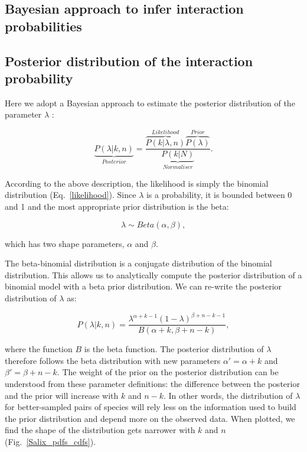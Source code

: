 \documentclass[12pt]{article}
\begin{document}
\begin{spacing}{2.0}
\section*{Bayesian approach to infer interaction probabilities}

    \subsection*{Posterior distribution of the interaction probability}

      Here we adopt a Bayesian approach to estimate the posterior distribution of the parameter $\lambda$ :

      \begin{equation}
        \underbrace{P(\lambda|k,n)}_{Posterior} = \frac{\overbrace{P(k|\lambda,n)}^{Likelihood}\overbrace{P(\lambda)}^{Prior}}{\underbrace{P(k|N)}_{Normaliser}} .
        \label{posterior}
      \end{equation}

      According to the above description, the likelihood is simply the binomial distribution (Eq.~\ref{likelihood}). Since $\lambda$ is a probability, it is bounded between 0 and 1 and the most appropriate prior distribution is the beta:

      \begin{equation}
        \lambda \sim Beta(\alpha,\beta) , \label{prior}
      \end{equation}

      \noindent which has two shape parameters, $\alpha$ and $\beta$. 

     The beta-binomial distribution is a conjugate distribution of the binomial distribution. This allows us to analytically compute the posterior distribution of a binomial model with a beta prior distribution. We can re-write the posterior distribution of $\lambda$ as:

      \begin{equation}
        P(\lambda|k,n) = \frac{\lambda^{\alpha+k-1}(1-\lambda)^{\beta+n-k-1}}{B(\alpha+k,\beta+n-k)} , \label{posterior2}
      \end{equation}

      
      \noindent where the function $B$ is the beta function. The posterior distribution of $\lambda$ therefore follows the beta distribution with new parameters $\alpha'= \alpha+k$ and $\beta'=\beta+n-k$. The weight of the prior on the posterior distribution can be understood from these parameter definitions: the difference between the posterior and the prior will increase with $k$ and $n-k$. In other words, the distribution of $\lambda$ for better-sampled pairs of species will rely less on the information used to build the prior distribution and depend more on the observed data.
      When plotted, we find the shape of the distribution gets narrower with $k$ and $n$ (Fig.~\ref{Salix_pdfs_cdfs}). 



\end{spacing}
\end{document}
